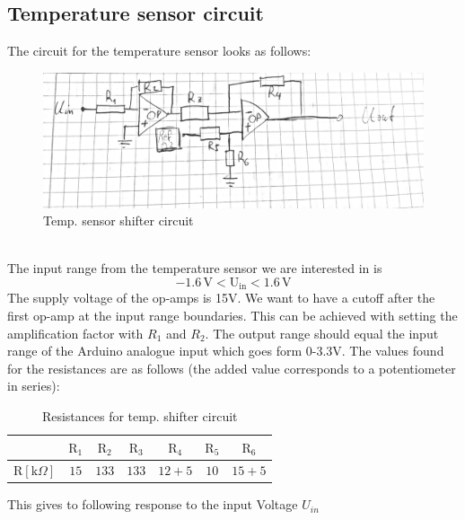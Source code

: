 \documentclass[12pt]{scrartcl}
\begin{document}
    \subsection{Temperature sensor circuit}
      The circuit for the temperature sensor looks as follows:
      \begin{figure}[h]
        \includegraphics[width = \textwidth]{circ.png}
        \caption{Temp. sensor shifter circuit}
        \label{fig1}
      \end{figure}
      \\The input range from the temperature sensor we are interested in is
      $$-1.6 \, \text{V} < \text{U}_{\text{in}} < 1.6\, \text{V}$$
      The supply voltage of the op-amps is 15V. We want to have a cutoff after
      the first op-amp at the input range boundaries. This can be achieved with
      setting the amplification factor with $R_1$ and $R_2$. The output range
      should equal the input range of the Arduino analogue input which goes form
      0-3.3V. The values found for the resistances are as follows (the added value
      corresponds to a potentiometer in series): \\
      \begin{table}[H]\label{tempres}
        \begin{tabular}{l|c c c c c c}
          & $\text{R}_1$ & $\text{R}_2$ & $\text{R}_3$ & $\text{R}_4$
          & $\text{R}_5$ & $\text{R}_6$ \\
          \hline\vspace{5pt}
          $\text{R}[\text{k}\Omega]$ & $15$ & $133$ & $133$ & $12 + 5$ & $10$
          & $15 + 5$
        \end{tabular}
        \caption{Resistances for temp. shifter circuit}
      \end{table}
      This gives to following response to the input Voltage $U_{in}$\\
\end{document}

